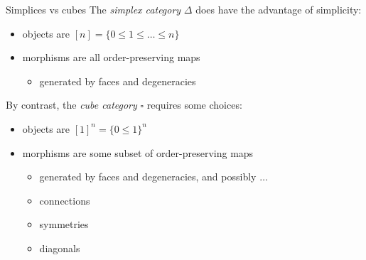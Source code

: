 \documentclass[compress]{beamer}
\let\amssquare\square
\newcommand{\Cube}{\amssquare} %
\newcommand{\1}{\mathbf{1}}
\begin{document}
\begin{frame}[fragile]{Simplices vs cubes}
	The \emph{simplex category} $\Delta$ does have the advantage of simplicity:
	\begin{itemize}
		\item objects are $[n] = \{0 \leq 1 \leq \dots \leq n \}$
		\item morphisms are all order-preserving maps
			\begin{itemize}
				\item generated by faces and degeneracies
			\end{itemize}
	\end{itemize}	
	\pause
	\vfill
	By contrast, the \emph{cube category} $\Cube$ requires some choices:
	\begin{itemize}
		\item objects are $[1]^n = \{0 \leq 1\}^n$
		\item morphisms are {\color{red}some subset of} order-preserving maps
			\begin{itemize}
				\item generated by faces and degeneracies, and possibly $\dots$
				\item connections
				\item symmetries
				\item diagonals
			\end{itemize}
	\end{itemize}	
\end{frame}
\end{document}
